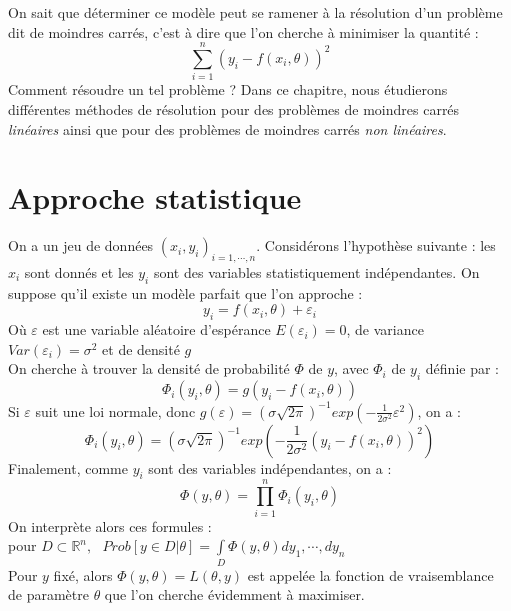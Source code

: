 \documentclass[a4paper,10pt]{report}
\begin{document}
On sait que déterminer ce modèle peut se ramener à la résolution d'un problème dit de moindres carrés, c'est à dire que l'on cherche à minimiser la quantité :
\abovedisplayskip=0mm
\begin{displaymath}
\sum \limits^{n}_{i=1} (y_i - f(x_i,\theta))^2
\end{displaymath}
Comment résoudre un tel problème ? Dans ce chapitre, nous étudierons différentes méthodes de résolution pour des problèmes de moindres carrés \textit{linéaires} ainsi que pour des problèmes de moindres carrés \textit{non linéaires}.

\newpage
\section{Approche statistique}
On a un jeu de données $(x_i,y_i)_{i=1,\cdots,n}$. Considérons l'hypothèse suivante : les $x_i$ sont donnés et les $y_i$ sont des variables statistiquement indépendantes. On suppose qu'il existe un modèle parfait que l'on approche :
\begin{displaymath}
y_i = f(x_i, \theta) + \varepsilon_i
\end{displaymath}
Où $\varepsilon$ est une variable aléatoire d'espérance $E(\varepsilon_i)=0$, de variance $Var(\varepsilon_i)=\sigma^2$ et de densité $g$\\
On cherche à trouver la densité de probabilité $\Phi$ de $y$, avec $\Phi_i$ de $y_i$  définie par :
\begin{displaymath}
\Phi_i(y_i, \theta)=g(y_i - f(x_i,\theta))
\end{displaymath}
Si $\varepsilon$ suit une loi normale, donc $g(\varepsilon)=(\sigma \sqrt{2\pi})^{-1}exp\left( -\frac{1}{2\sigma^2} \varepsilon^2 \right)$, on a :\\
\begin{displaymath}
\Phi_i(y_i, \theta)=(\sigma \sqrt{2\pi})^{-1}exp\left( -\frac{1}{2\sigma^2} (y_i - f(x_i,\theta))^2 \right)
\end{displaymath}
Finalement, comme $y_i$ sont des variables indépendantes, on a :
\begin{displaymath}
\Phi(y, \theta)=\prod \limits_{i=1}^n \Phi_i(y_i, \theta)
\end{displaymath}
On interprète alors ces formules :\\
pour $D \subset \mathbb{R}^n, \ \ \ Prob[y \in D | \theta]=\int \limits_D \Phi(y,\theta)dy_1,\cdots,dy_n$\\
Pour $y$ fixé, alors $\Phi(y,\theta)=L(\theta,y)$ est appelée la fonction de vraisemblance de paramètre $\theta$ que l'on cherche évidemment à maximiser.
\end{document}
